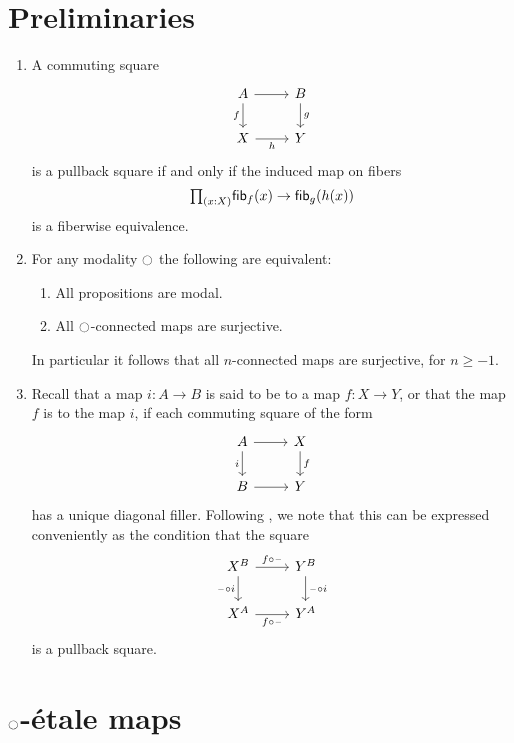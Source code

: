 \documentclass[9pt,twosided]{amsart}
\begin{document}
\section{Preliminaries}
\begin{enumerate}
\item A commuting square
\begin{equation*}
\begin{tikzcd}
A \arrow[d,swap,"f"] \arrow[r] & B \arrow[d,"g"] \\
X \arrow[r,swap,"h"] & Y
\end{tikzcd}
\end{equation*}
is a pullback square if and only if the induced map on fibers
\begin{equation*}
\prd{x:X}\fib{f}{x}\to\fib{g}{h(x)}
\end{equation*}
is a fiberwise equivalence.
\item For any modality ${\ocircle}$ the following are equivalent:
\begin{enumerate}
\item All propositions are modal.
\item All ${\ocircle}$-connected maps are surjective.
\end{enumerate}
In particular it follows that all $n$-connected maps are surjective, for $n\geq -1$.
\item Recall that a map $i:A\to B$ is said to be  to a map $f:X\to Y$, or that the map $f$ is  to the map $i$,
if each commuting square of the form
\begin{equation*}
\begin{tikzcd}
A \arrow[r] \arrow[d,swap,"i"] & X \arrow[d,"f"] \\
B \arrow[r] & Y
\end{tikzcd}
\end{equation*}
has a unique diagonal filler. Following \cite{AnelBiedermanFinsterJoyal}, we note that this can be expressed conveniently as the condition that the square
\begin{equation*}
\begin{tikzcd}
X^B \arrow[r,"f\circ\blank"] \arrow[d,swap,"\blank\circ i"] & Y^B \arrow[d,"\blank\circ i"] \\
X^A \arrow[r,swap,"f\circ\blank"] & Y^A
\end{tikzcd}
\end{equation*}
is a pullback square.
\end{enumerate}

\section{\texorpdfstring{${\ocircle}$}{○}-\'etale maps}
\end{document}
